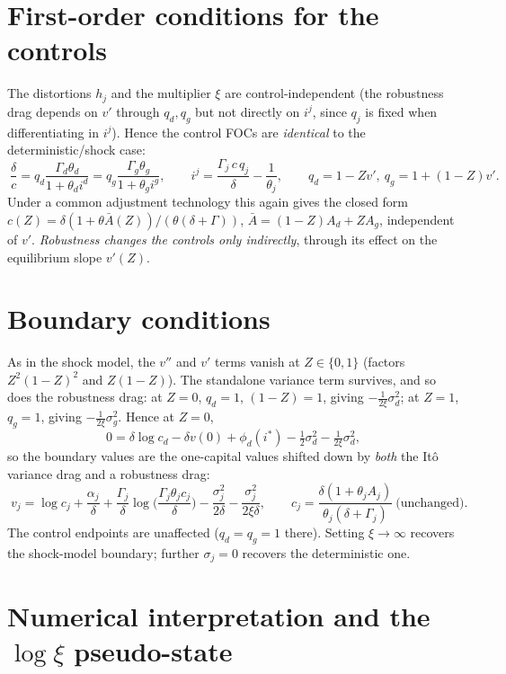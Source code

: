 \documentclass[11pt]{article}
\newcommand{\xicap}{\xi}
\begin{document}
\section{First-order conditions for the controls}

The distortions $h_j$ and the multiplier $\xicap$ are control-independent (the
robustness drag depends on $v'$ through $q_d,q_g$ but not directly on $i^j$, since
$q_j$ is fixed when differentiating in $i^j$). Hence the control FOCs are
\emph{identical} to the deterministic/shock case:
\[
\boxed{\ \frac{\delta}{c}=q_d\frac{\Gamma_d\theta_d}{1+\theta_d i^d}
=q_g\frac{\Gamma_g\theta_g}{1+\theta_g i^g},\qquad
i^j=\frac{\Gamma_j\,c\,q_j}{\delta}-\frac1{\theta_j},\qquad
q_d=1-Zv',\ q_g=1+(1-Z)v'.\ }
\]
Under a common adjustment technology this again gives the closed form
$c(Z)=\delta(1+\theta\bar A(Z))/(\theta(\delta+\Gamma))$, $\bar A=(1-Z)A_d+ZA_g$,
independent of $v'$. \emph{Robustness changes the controls only indirectly}, through
its effect on the equilibrium slope $v'(Z)$.

\section{Boundary conditions}

As in the shock model, the $v''$ and $v'$ terms vanish at $Z\in\{0,1\}$ (factors
$Z^2(1-Z)^2$ and $Z(1-Z)$). The standalone variance term survives, and so does the
robustness drag: at $Z=0$, $q_d=1$, $(1-Z)=1$, giving $-\tfrac{1}{2\xicap}\sigma_d^2$;
at $Z=1$, $q_g=1$, giving $-\tfrac{1}{2\xicap}\sigma_g^2$. Hence at $Z=0$,
\[
0=\delta\log c_d-\delta v(0)+\phi_d(i^\ast)-\tfrac12\sigma_d^2-\tfrac{1}{2\xicap}\sigma_d^2,
\]
so the boundary values are the one-capital values shifted down by \emph{both} the
It\^o variance drag and a robustness drag:
\[
\boxed{\;
v_j=\log c_j+\frac{\alpha_j}{\delta}
+\frac{\Gamma_j}{\delta}\log\!\Big(\frac{\Gamma_j\theta_j c_j}{\delta}\Big)
-\frac{\sigma_j^2}{2\delta}-\frac{\sigma_j^2}{2\xicap\delta},
\qquad
c_j=\frac{\delta(1+\theta_j A_j)}{\theta_j(\delta+\Gamma_j)}\ \text{(unchanged)}.
\;}
\]
The control endpoints are unaffected ($q_d=q_g=1$ there). Setting $\xicap\to\infty$
recovers the shock-model boundary; further $\sigma_j=0$ recovers the deterministic one.

\section{Numerical interpretation and the $\log\xicap$ pseudo-state}
\end{document}
